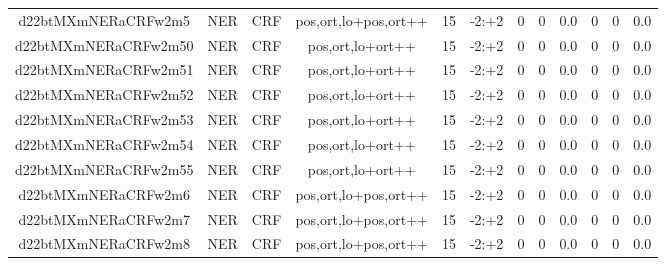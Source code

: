 \documentclass[a4paper]{article}
\begin{document}
\begin{landscape}
\begin{center}
\begin{tabular}{ |c|c|c|c|c|c|c|c|c|c|c|c|}
 
 	
 	\small{ d22btMXmNERaCRFw2m5 } & \small{ NER} & \small{  CRF }  & pos,ort,lo+pos,ort++  &  15 &  \small{  -2:+2 }  &  0 & 0 & 0.0  &  0 & 0 & 0.0 \\
 	

 
 	
 	\small{ d22btMXmNERaCRFw2m50 } & \small{ NER} & \small{  CRF }  & pos,ort,lo+ort++  &  15 &  \small{  -2:+2 }  &  0 & 0 & 0.0  &  0 & 0 & 0.0 \\
 	

 
 	
 	\small{ d22btMXmNERaCRFw2m51 } & \small{ NER} & \small{  CRF }  & pos,ort,lo+ort++  &  15 &  \small{  -2:+2 }  &  0 & 0 & 0.0  &  0 & 0 & 0.0 \\
 	

 
 	
 	\small{ d22btMXmNERaCRFw2m52 } & \small{ NER} & \small{  CRF }  & pos,ort,lo+ort++  &  15 &  \small{  -2:+2 }  &  0 & 0 & 0.0  &  0 & 0 & 0.0 \\
 	

 
 	
 	\small{ d22btMXmNERaCRFw2m53 } & \small{ NER} & \small{  CRF }  & pos,ort,lo+ort++  &  15 &  \small{  -2:+2 }  &  0 & 0 & 0.0  &  0 & 0 & 0.0 \\
 	

 
 	
 	\small{ d22btMXmNERaCRFw2m54 } & \small{ NER} & \small{  CRF }  & pos,ort,lo+ort++  &  15 &  \small{  -2:+2 }  &  0 & 0 & 0.0  &  0 & 0 & 0.0 \\
 	

 
 	
 	\small{ d22btMXmNERaCRFw2m55 } & \small{ NER} & \small{  CRF }  & pos,ort,lo+ort++  &  15 &  \small{  -2:+2 }  &  0 & 0 & 0.0  &  0 & 0 & 0.0 \\
 	

 
 	
 	\small{ d22btMXmNERaCRFw2m6 } & \small{ NER} & \small{  CRF }  & pos,ort,lo+pos,ort++  &  15 &  \small{  -2:+2 }  &  0 & 0 & 0.0  &  0 & 0 & 0.0 \\
 	

 
 	
 	\small{ d22btMXmNERaCRFw2m7 } & \small{ NER} & \small{  CRF }  & pos,ort,lo+pos,ort++  &  15 &  \small{  -2:+2 }  &  0 & 0 & 0.0  &  0 & 0 & 0.0 \\
 	

 
 	
 	\small{ d22btMXmNERaCRFw2m8 } & \small{ NER} & \small{  CRF }  & pos,ort,lo+pos,ort++  &  15 &  \small{  -2:+2 }  &  0 & 0 & 0.0  &  0 & 0 & 0.0 \\
 	


\end{tabular}
\end{center}
\end{landscape}
\end{document}
